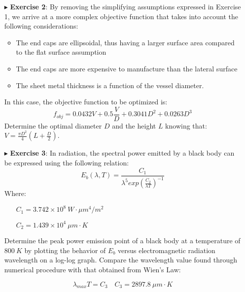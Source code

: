 \documentclass[xcolor={dvipsnames,rgb}, aspectratio=169]{beamer}
\begin{document}
\begin{frame}
   \begin{itemize}
      \item[$\blacktriangleright$] \textbf{Exercise 2}: By removing the simplifying
         assumptions expressed in Exercise 1, we arrive at a more complex objective
         function that takes into account the following considerations:
         \begin{itemize}
            \item The end caps are ellipsoidal, thus having a larger surface area
               compared to the flat surface assumption
            \item The end caps are more expensive to manufacture than the lateral surface
            \item The sheet metal thickness is a function of the vessel diameter.
         \end{itemize}
         In this case, the objective function to be optimized is:
         \begin{equation*}
            f_{obj} = 0.0432V + 0.5 \frac{V}{D} + 0.3041D^2 + 0.0263D^3
         \end{equation*}
         Determine the optimal diameter $D$ and the height $L$  knowing that:
         $V=\frac{\pi D^2}{4}\left(L+\frac{D}{2}\right)$.
   \end{itemize}
\end{frame}

\begin{frame}
   \begin{itemize}
      \item[$\blacktriangleright$] \textbf{Exercise 3}: In radiation, the spectral power
         emitted by a black body can be expressed using the following relation:
         \begin{equation*}
            E_b \left( \lambda , T \right) = \frac{C_1}{\lambda ^5
            exp\left(\frac{C_2}{\lambda T}\right)^{-1}}
         \end{equation*}
         Where:
         \begin{itemize}
            \item[ ] $C_1 = 3.742 \times 10^8 \: W \cdot \mu m^4 / m^2$
            \item[ ] $C_2 = 1.439 \times 10^4 \: \mu m \cdot K$
         \end{itemize}

         Determine the peak power emission point of a black body at a temperature of $800
         \: K$ by plotting the behavior of $E_b$ versus electromagnetic radiation
         wavelength on a log-log graph. Compare the wavelength value found through
         numerical procedure with that obtained from Wien's Law:

         \begin{equation*}
            \lambda_{max}T = C_{3} \quad C_3 = 2897.8 \: \mu m \cdot K
         \end{equation*}
   \end{itemize}
\end{frame}
\end{document}
